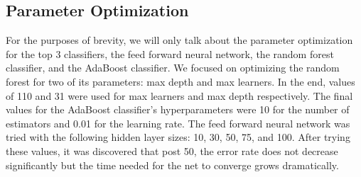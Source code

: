 \documentclass{article} %
\begin{document}
\subsection{Parameter Optimization}
For the purposes of brevity, we will only talk about the parameter optimization for the top 3 classifiers, the feed forward neural network, the random forest classifier, and the AdaBoost classifier. We focused on optimizing the random forest for two of its parameters: max depth and max learners. In the end, values of 110 and 31 were used for max learners and max depth respectively. The final values for the AdaBoost classifier's hyperparameters were 10 for the number of estimators and 0.01 for the learning rate. The feed forward neural network was tried with the following hidden layer sizes: 10, 30, 50, 75, and 100. After trying these values, it was discovered that post 50, the error rate does not decrease significantly but the time needed for the net to converge grows dramatically.
\end{document}
